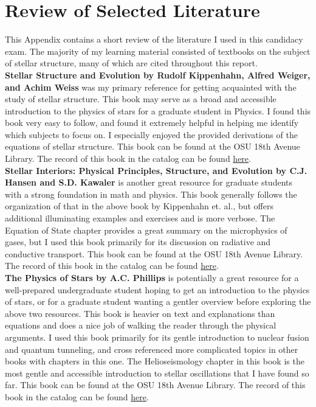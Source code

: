 \documentclass[12pt]{article}
\begin{document}
\renewcommand{\thesection}{\Alph{section}}

\section{Review of Selected Literature} \label{ap:lit}
This Appendix contains a short review of the literature I used in this candidacy exam. The majority of my learning material consisted of textbooks on the subject of stellar structure, many of which are cited throughout this report.\\

\textbf{Stellar Structure and Evolution by Rudolf Kippenhahn, Alfred Weiger, and Achim Weiss} was my primary reference for getting acquainted with the study of stellar structure. This book may serve as a broad and accessible introduction to the physics of stars for a graduate student in Physics. I found this book very easy to follow,  and found it extremely helpful in helping me identify which subjects to focus on. I especially enjoyed the provided derivations of the equations of stellar structure. This book can be found at the OSU 18th Avenue Library. The record of this book in the catalog can be found \href{https://library.ohio-state.edu/record=b7190503~S7}{here}. \\

\textbf{Stellar Interiors: Physical Principles, Structure, and Evolution by C.J. Hansen and S.D. Kawaler} is another great resource for graduate students with a strong foundation in math and physics. This book generally follows the organization of that in the above book by Kippenhahn et. al., but offers additional illuminating examples and exercises and is more verbose. The Equation of State chapter provides a great summary on the microphysics of gases, but I used this book primarily for its discussion on radiative and conductive transport. This book can be found at the OSU 18th Avenue Library. The record of this book in the catalog can be found \href{https://library.ohio-state.edu/record=b4338038~S7}{here}. \\

\textbf{The Physics of Stars by A.C. Phillips} is potentially a great resource for a well-prepared undergraduate student hoping to get an introduction to the physics of stars, or for a graduate student wanting a gentler overview before exploring the above two resources. This book is heavier on text and explanations than equations and does a nice job of walking the reader through the physical arguments. I used this book primarily for its gentle introduction to nuclear fusion and quantum tunneling, and cross referenced more complicated topics in other books with chapters in this one. The Helioseismology chapter in this book is the most gentle and accessible introduction to stellar oscillations that I have found so far. This book can be found at the OSU 18th Avenue Library. The record of this book in the catalog can be found \href{https://library.ohio-state.edu/record=b5117032~S7}{here}. \\
\end{document}
